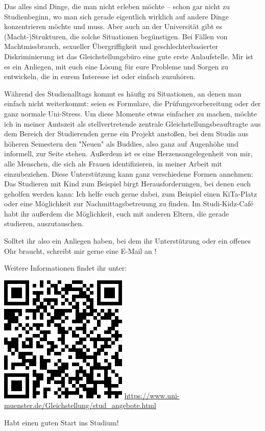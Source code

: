 \begin{multicols}{2}
Das alles sind Dinge, die man nicht erleben möchte – schon gar nicht zu Studienbeginn, wo man sich gerade eigentlich wirklich auf andere Dinge konzentrieren möchte und muss. Aber auch an der Universität gibt es (Macht-)Strukturen, die solche Situationen begünstigen. 
Bei Fällen von Machtmissbrauch, sexueller Übergriffigkeit und geschlechterbasierter Diskriminierung ist das Gleichstellungsbüro eine gute erste Anlaufstelle. Mir ist es ein Anliegen, mit euch eine Lösung für eure Probleme und Sorgen zu entwickeln, die in eurem Interesse ist oder einfach zuzuhören. 

Während des Studienalltags kommt es häufig zu Situationen, an denen man einfach nicht weiterkommt: seien es Formulare, die Prüfungsvorbereitung oder der ganz normale Uni-Stress. Um diese Momente etwas einfacher zu machen, möchte ich in meiner Amtszeit als stellvertretende zentrale Gleichstellungsbeauftragte aus dem Bereich der Studierenden gerne ein Projekt anstoßen, bei dem Studis aus höheren Semestern den "Neuen" als Buddies, also ganz auf Augenhöhe und informell, zur Seite stehen. 
Außerdem ist es eine Herzensangelegenheit von mir, alle Menschen, die sich als Frauen identifizieren, in meiner Arbeit mit einzubeziehen. 
Diese Unterstützung kann ganz verschiedene Formen annehmen: Das Studieren mit Kind zum Beispiel birgt Herausforderungen, bei denen euch geholfen werden kann: Ich helfe euch gerne dabei, zum Beispiel einen KiTa-Platz oder eine Möglichkeit zur Nachmittagsbetreuung zu finden. Im Studi-Kidz-Café habt ihr außerdem die Möglichkeit, euch mit anderen Eltern, die gerade studieren, auszutauschen. 

Solltet ihr also ein Anliegen haben, bei dem ihr Unterstützung oder ein offenes Ohr braucht, schreibt mir gerne eine E-Mail an ! 

Weitere Informationen findet ihr unter: 
\begin{center}
  \includegraphics[width=0.7\columnwidth]{res/StudzGB.png}
  \smallskip
  \url{https://www.uni-muenster.de/Gleichstellung/stud\_angebote.html} 
\end{center}

Habt einen guten Start ins Studium!
 
 
\end{multicols}
